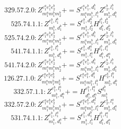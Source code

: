 \documentclass[letterpaper,10pt,fleqn,leqno,onecolumn]{article}
\begin{document}
\begin{equation} \;\;\;\;\;\;  329.57.2.0: Z^{e_{1}^{a}e_{1}^{b}e_{2}^{b}}_{m_{1}^{a}m_{1}^{b}m_{2}^{b}}+=S^{e_{1}^{a}e_{1}^{b},d_{1}^{b}}_{m_{1}^{a}m_{1}^{b},l_{1}^{b}}Z^{e_{2}^{b},l_{1}^{b}}_{m_{2}^{b},d_{1}^{b}} \end{equation}
\begin{equation} \;\;\;\;\;\;  525.74.1.1: Z^{e_{1}^{b},l_{1}^{b}}_{m_{1}^{b},d_{1}^{b}}+=S^{e_{1}^{b},d_{2}^{b}}_{m_{1}^{b},l_{2}^{b}}H^{l_{1}^{b},l_{2}^{b}}_{d_{1}^{b},d_{2}^{b}} \end{equation}
\begin{equation} \;\;\;\;\;\;  525.74.2.0: Z^{e_{1}^{a}e_{1}^{b}e_{2}^{b}}_{m_{1}^{a}m_{1}^{b}m_{2}^{b}}+=S^{e_{1}^{a}e_{1}^{b},d_{1}^{b}}_{m_{1}^{a}m_{1}^{b},l_{1}^{b}}Z^{e_{2}^{b},l_{1}^{b}}_{m_{2}^{b},d_{1}^{b}} \end{equation}
\begin{equation} \;\;\;\;\;\;  541.74.1.1: Z^{e_{1}^{b},l_{1}^{b}}_{m_{1}^{b},d_{1}^{b}}+=S^{e_{1}^{b},d_{1}^{a}}_{m_{1}^{b},l_{1}^{a}}H^{l_{1}^{b},l_{1}^{a}}_{d_{1}^{b},d_{1}^{a}} \end{equation}
\begin{equation} \;\;\;\;\;\;  541.74.2.0: Z^{e_{1}^{a}e_{1}^{b}e_{2}^{b}}_{m_{1}^{a}m_{1}^{b}m_{2}^{b}}+=S^{e_{1}^{a}e_{1}^{b},d_{1}^{b}}_{m_{1}^{a}m_{1}^{b},l_{1}^{b}}Z^{e_{2}^{b},l_{1}^{b}}_{m_{2}^{b},d_{1}^{b}} \end{equation}
\begin{equation} \;\;\;\;\;\;  126.27.1.0: Z^{e_{1}^{a}e_{1}^{b}e_{2}^{b}}_{m_{1}^{a}m_{1}^{b}m_{2}^{b}}+=S^{e_{1}^{a}e_{1}^{b},d_{1}^{b}}_{m_{1}^{a}m_{1}^{b},l_{1}^{b}}H^{e_{2}^{b},l_{1}^{b}}_{m_{2}^{b},d_{1}^{b}} \end{equation}
\begin{equation} \;\;\;\;\;\;  332.57.1.1: Z^{e_{1}^{b},l_{1}^{a}}_{m_{1}^{b},d_{1}^{a}}+=H^{e_{1}^{b},l_{1}^{a}}_{d_{1}^{b},d_{1}^{a}}S^{d_{1}^{b}}_{m_{1}^{b}} \end{equation}
\begin{equation} \;\;\;\;\;\;  332.57.2.0: Z^{e_{1}^{a}e_{1}^{b}e_{2}^{b}}_{m_{1}^{a}m_{1}^{b}m_{2}^{b}}+=S^{e_{1}^{a}e_{1}^{b},d_{1}^{a}}_{m_{1}^{a}m_{1}^{b},l_{1}^{a}}Z^{e_{2}^{b},l_{1}^{a}}_{m_{2}^{b},d_{1}^{a}} \end{equation}
\begin{equation} \;\;\;\;\;\;  531.74.1.1: Z^{e_{1}^{b},l_{1}^{a}}_{m_{1}^{b},d_{1}^{a}}+=S^{e_{1}^{b},d_{1}^{b}}_{m_{1}^{b},l_{1}^{b}}H^{l_{1}^{b},l_{1}^{a}}_{d_{1}^{b},d_{1}^{a}} \end{equation}
\end{document}
